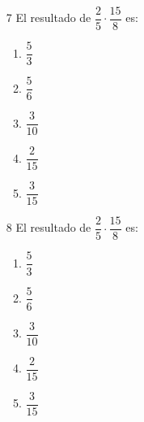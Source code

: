 \documentclass[12pt]{article}
\begin{document}
\begin{multicols}{2}
	\begin{enumerate}
		\item [7]El resultado de $\dfrac{2}{5} \cdot \dfrac{15}{8}$	es:
		\begin{enumerate}
			\item $\dfrac{5}{3}$\\
			\item $\dfrac{5}{6}$\\
			\item $\dfrac{3}{10}$\\
			\item $\dfrac{2}{15}$\\
			\item $\dfrac{3}{15}$\\
		\end{enumerate}
	\end{enumerate}
\begin{enumerate}
	\item [8]El resultado de $\dfrac{2}{5} \cdot \dfrac{15}{8}$	es:
	\begin{enumerate}
		\item $\dfrac{5}{3}$\\
		\item $\dfrac{5}{6}$\\
		\item $\dfrac{3}{10}$\\
		\item $\dfrac{2}{15}$\\
		\item $\dfrac{3}{15}$\\
	\end{enumerate}
\end{enumerate}
\end{multicols}
\ \\ \ \\ \ \\ \ \\ \ \\
\end{document}
